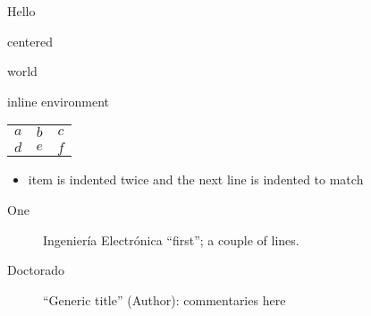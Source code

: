 \documentclass{minimal}
\begin{document}
Hello
\begin{centering} centered \end{centering}
world

\begin{outer}
  \begin{inner} inline environment \end{inner}
\end{outer}

\begin{tabular}{%
  ccc}
  $a$ & $b$ & $c$ \\
  $d$ & $e$ & $f$
\end{tabular}

\begin{itemize}
  \item item is indented twice
    and the next line is indented to match
\end{itemize}

\begin{description}
  \item[One] Ingeniería Electrónica ``first'';
    a couple of lines.
  \item[Doctorado] ``Generic title''
    (Author): commentaries here
\end{description}
\end{document}
